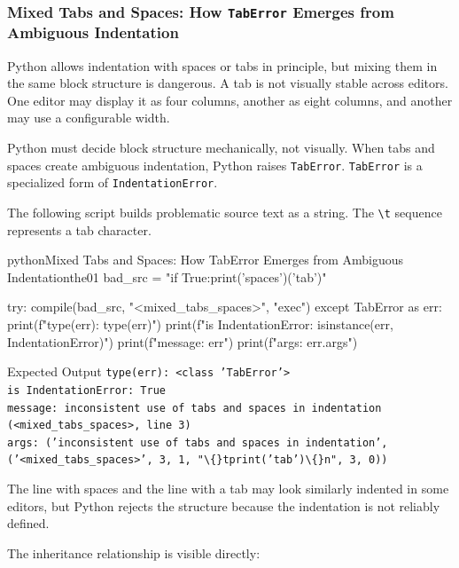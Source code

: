 \subsubsection{Mixed Tabs and Spaces: How \texttt{TabError} Emerges from Ambiguous Indentation}

Python allows indentation with spaces or tabs in principle, but mixing them in the same block structure is dangerous. A tab is not visually stable across editors. One editor may display it as four columns, another as eight columns, and another may use a configurable width.

Python must decide block structure mechanically, not visually. When tabs and spaces create ambiguous indentation, Python raises \texttt{TabError}. \texttt{TabError} is a specialized form of \texttt{IndentationError}.

The following script builds problematic source text as a string. The \texttt{\textbackslash t} sequence represents a tab character.

\begin{codebox}[]{python}{Mixed Tabs and Spaces: How TabError Emerges from Ambiguous Indentation}{the01}
bad_src = "if True:\n        print('spaces')\n\tprint('tab')\n"

try:
    compile(bad_src, "<mixed_tabs_spaces>", "exec")
except TabError as err:
    print(f"type(err): {type(err)}")
    print(f"is IndentationError: {isinstance(err, IndentationError)}")
    print(f"message: {err}")
    print(f"args: {err.args}")
\end{codebox}


\begin{iobox}{Expected Output}
\texttt{type(err): <class 'TabError'>} \\
\texttt{is IndentationError: True} \\
\texttt{message: inconsistent use of tabs and spaces in indentation (<mixed\_tabs\_spaces>, line 3)} \\
\texttt{args: ('inconsistent use of tabs and spaces in indentation', ('<mixed\_tabs\_spaces>', 3, 1, "\textbackslash\{\}tprint('tab')\textbackslash\{\}n", 3, 0))} \\
\end{iobox}


The line with spaces and the line with a tab may look similarly indented in some editors, but Python rejects the structure because the indentation is not reliably defined.

The inheritance relationship is visible directly:

